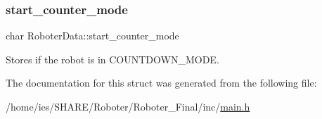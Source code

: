 \subsubsection{\texorpdfstring{start\+\_\+counter\+\_\+mode}{start\_counter\_mode}}
{\footnotesize\ttfamily char Roboter\+Data\+::start\+\_\+counter\+\_\+mode}

Stores if the robot is in C\+O\+U\+N\+T\+D\+O\+W\+N\+\_\+\+M\+O\+DE. 

The documentation for this struct was generated from the following file\+:\begin{DoxyCompactItemize}
\item 
/home/ies/\+S\+H\+A\+R\+E/\+Roboter/\+Roboter\+\_\+\+Final/inc/\hyperlink{main_8h}{main.\+h}\end{DoxyCompactItemize}
